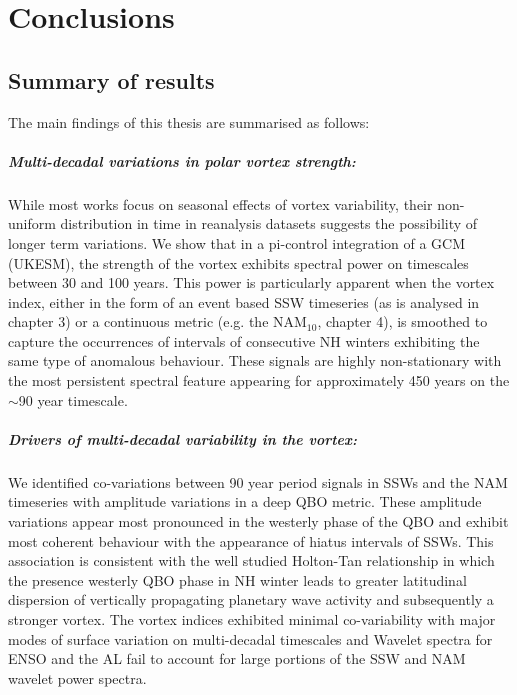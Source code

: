 \chapter{Conclusions}
\label{cha:conclusions}

\section{Summary of results}

The main findings of this thesis are summarised as follows: 

\paragraph{Multi-decadal variations in polar vortex strength:}
While most works focus on seasonal effects of vortex variability, their non-uniform distribution in time in reanalysis datasets suggests the possibility of longer term variations. We show that in a pi-control integration of a GCM (UKESM), the strength of the vortex exhibits spectral power on timescales between 30 and 100 years. This power is particularly apparent when the vortex index, either in the form of an event based SSW timeseries (as is analysed in chapter 3) or a continuous metric (e.g. the NAM$_{10}$, chapter 4), is smoothed to capture the occurrences of intervals of consecutive NH winters exhibiting the same type of anomalous behaviour. These signals are highly non-stationary with the most persistent spectral feature appearing for approximately 450 years on the $\sim$90 year timescale. 

\paragraph{Drivers of multi-decadal variability in the vortex:}
We identified co-variations between 90 year period signals in SSWs and the NAM timeseries with amplitude variations in a deep QBO metric. These amplitude variations appear most pronounced in the westerly phase of the QBO and exhibit most coherent behaviour with the appearance of hiatus intervals of SSWs. This association is consistent with the well studied Holton-Tan relationship in which the presence westerly QBO phase in NH winter leads to greater latitudinal dispersion of vertically propagating planetary wave activity and subsequently a stronger vortex. The vortex indices exhibited minimal co-variability with major modes of surface variation on multi-decadal timescales and Wavelet spectra for ENSO and the AL fail to account for large portions of the SSW and NAM wavelet power spectra.

